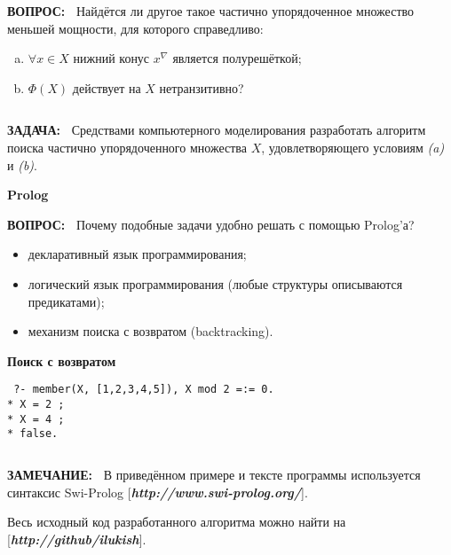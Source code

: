 \documentclass{beamer}
\newcommand{\green}{\color[rgb]{0,0.4,0}}
\newcommand{\blue}{\color{blue}}
\newcommand{\remark}{%
     {\bf \green ЗАМЕЧАНИЕ:\ }}
\newcommand{\question}{%
     {\bf \green ВОПРОС:\ }}
\newcommand{\goal}{%
     {\bf \green ЗАДАЧА:\ }}
\newcommand{\retline}{
	
$ $

}
\begin{document}
\begin{frame}

{\question}
Найдётся ли другое такое частично упорядоченное множество меньшей мощности, для которого справедливо:
\begin{enumerate}[(a)]
	\item
$\forall x \in X$ нижний конус $x^\nabla$ является полурешёткой;
	\item
$\Phi(X)$ действует на $X$ нетранзитивно?
\end{enumerate}
{\retline}

{\goal}
Средствами компьютерного моделирования разработать алгоритм поиска частично упорядоченного множества $X$, удовлетворяющего условиям \textit{(a)} и \textit{(b)}.
\end{frame}

\begin{frame} 
{\bf {\blue} Prolog }

{\question} Почему подобные задачи удобно решать с помощью Prolog'а?

\begin{itemize}
\item
декларативный язык программирования;
\item
логический язык программирования (любые структуры описываются предикатами);
\item
механизм поиска с возвратом (backtracking).
\end{itemize}

\end{frame}

\begin{frame}[fragile]
{\bf {\blue} Поиск с возвратом }

{\tt
?- member(X, [1,2,3,4,5]), X mod 2 =:= 0. \\*
\pause
X = 2 ; \\*
\pause
X = 4 ; \\*
\pause
false.
}

\pause
{\retline}

{\remark} В приведённом примере и тексте программы используется синтаксис Swi-Prolog
[\textit{{\bf {\blue http://www.swi-prolog.org/}}}].

Весь исходный код разработанного алгоритма можно найти на
[\textit{{\bf {\blue http://github/ilukish}}}].

\end{frame}
\end{document}
